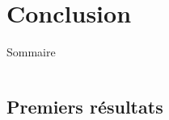 \documentclass[9pt]{beamer}
\begin{document}

\section{Conclusion}

\begin{frame}{Sommaire}
	\begin{columns}[onlytextwidth,T]
        \begin{column}{.45\textwidth}
            \tableofcontents[currentsection, sections=1-2]
        \end{column}
        \begin{column}{.45\textwidth}
            \tableofcontents[currentsection, sections=3-5]
        \end{column}
    \end{columns}
\end{frame}


\subsection{Premiers résultats}
\end{document}
